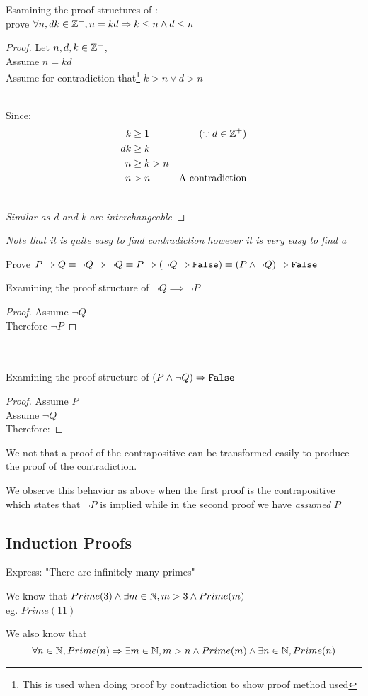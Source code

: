 \documentclass[12pt, letterpaper, twoside]{article}
\begin{document}
Esamining the proof structures of  :\\

 prove $\forall n, d k \in \mathbb Z^+, n = kd \mathrel{\Rightarrow} k \le n \land d \le n$
\begin{proof}
    Let $n, d, k \in \mathbb Z^+$,\\
    Assume $n = kd$\\
    Assume for contradiction that\footnote{This is used when doing proof by contradiction to show proof method used} 
    $k > n \lor d > n$

    \\
    Since:
    \begin{align*}
        k &\ge 1 &(\because d \in \mathbb Z^+)\\
        dk &\ge k\\
        n &\ge k > n\\
        n &> n &\text{A contradiction}
    \end{align*}

    \\
    \emph{Similar as d and k are interchangeable}
\end{proof}

\emph{Note that it is quite easy to find  contradiction however it is
very easy to find a }

 Prove $P \mathrel{\Rightarrow} Q \equiv \lnot Q \mathrel{\Rightarrow} \lnot Q \equiv P \mathrel{\Rightarrow} (\lnot Q \mathrel{\Rightarrow} \texttt{False}) \equiv (P \land \lnot Q) \mathrel{\Rightarrow} \texttt{False}$

Examining the proof structure of $\lnot Q \implies \lnot P$
\begin{proof}
    Assume $\lnot Q$\\
    Therefore $\lnot P$
\end{proof}
\\
\\
Examining the proof structure of $(P \land \lnot Q) \mathrel{\Rightarrow} \texttt{False}$
\begin{proof}
    Assume $P$\\
    Assume $\lnot Q$\\
    Therefore: \False
\end{proof}

We not that a proof of the contrapositive can be transformed easily to produce the proof
of the contradiction.

We observe this behavior as above when the first proof is the contrapositive which
states that $\lnot P$ is implied while in the second proof we have \emph{assumed} $P$ 

\subsection{Induction Proofs}
Express: "There are infinitely many primes"

We know that $Prime(3) \land \exists m \in \mathbb N, m > 3 \land Prime(m)$\\
\hspace*{10mm} eg. $Prime(11)$

We also know that $$\forall n \in \mathbb N, Prime(n) \mathrel{\Rightarrow} \exists m \in \mathbb N, m > n \land Prime(m) \land \exists n \in \mathbb N, Prime(n) $$
\end{document}
